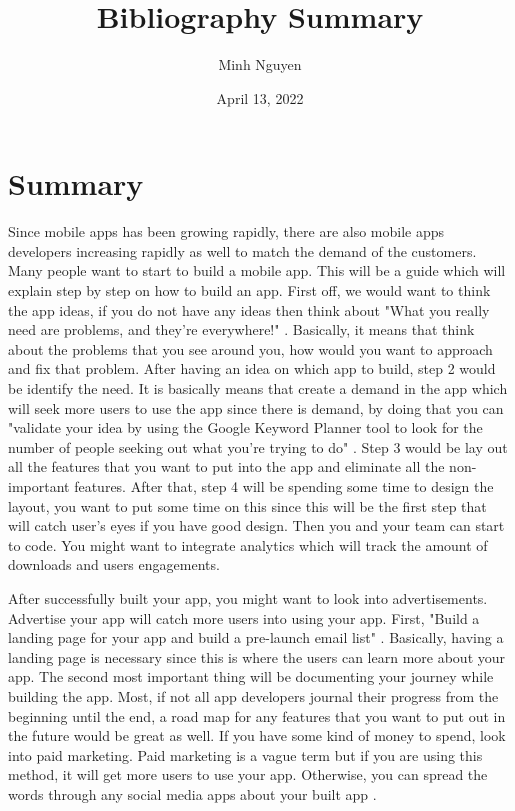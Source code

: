 \documentclass{article}
\title{Bibliography Summary}
\author{Minh Nguyen}
\date{April 13, 2022}
\begin{document}
\maketitle

\section*{Summary}
Since mobile apps has been growing rapidly, there are also mobile apps developers increasing rapidly as well to match the demand of the customers. Many people want to start to build a mobile app. This will be a guide which will explain step by step on how to build an app. First off, we would want to think the app ideas, if you do not have any ideas then think about "What you really need are problems, and they’re everywhere!" \cite{Rahul19}. Basically, it means that think about the problems that you see around you, how would you want to approach and fix that problem. After having an idea on which app to build, step 2 would be identify the need. It is basically means that create a demand in the app which will seek more users to use the app since there is demand, by doing that you can "validate your idea by using the Google Keyword Planner tool to look for the number of people seeking out what you’re trying to do" \cite{Rahul19}. Step 3 would be lay out all the features that you want to put into the app and eliminate all the non-important features. After that, step 4 will be spending some time to design the layout, you want to put some time on this since this will be the first step that will catch user's eyes if you have good design. Then you and your team can start to code. You might want to integrate analytics which will track the amount of downloads and users engagements.

\medskip

After successfully built your app, you might want to look into advertisements. Advertise your app will catch more users into using your app. First, "Build a landing page for your app and build a pre-launch email list" \cite{Chris21}. Basically, having a landing page is necessary since this is where the users can learn more about your app. The second most important thing will be documenting your journey while building the app. Most, if not all app developers journal their progress from the beginning until the end, a road map for any features that you want to put out in the future would be great as well. If you have some kind of money to spend, look into paid marketing. Paid marketing is a vague term but if you are using this method, it will get more users to use your app. Otherwise, you can spread the words through any social media apps about your built app \cite{Chris21}.




\printbibliography
\end{document}
